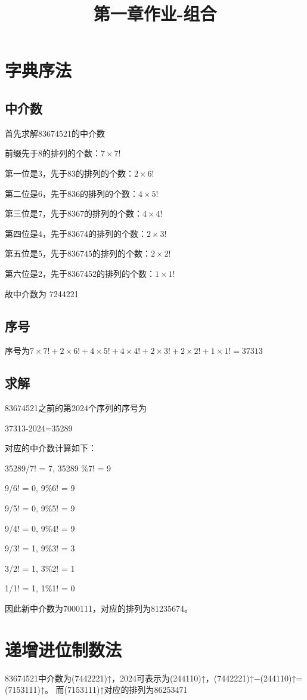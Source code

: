 \documentclass{article}
\title{第一章作业-组合}
\begin{document}
\begin{CJK}{UTF8}{gbsn}
\date{}


\maketitle

\section*{字典序法}
\subsection*{中介数} 
首先求解83674521的中介数

前缀先于8的排列的个数：$7×7!$

第一位是3，先于83的排列的个数：$2×6!$

第二位是6，先于836的排列的个数：$4×5!$

第三位是7，先于8367的排列的个数：$4×4!$

第四位是4，先于83674的排列的个数：$2×3!$

第五位是5，先于836745的排列的个数：$2×2!$

第六位是2，先于8367452的排列的个数：$1×1!$

故中介数为 7244221

\subsection*{序号} 
序号为$7×7!+2×6!+4×5!+4×4!+2×3!+2×2!+1×1!=37313$
\subsection*{求解} 
83674521之前的第2024个序列的序号为

37313-2024=35289

对应的中介数计算如下：

35289/7! = 7, 35289 \%7! = 9 
 
9/6! = 0, 9\%6! = 9

9/5! = 0, 9\%5! = 9

9/4! = 0, 9\%4! = 9

9/3! = 1, 9\%3! = 3

3/2! = 1, 3\%2! = 1

1/1! = 1, 1\%1! = 0

因此新中介数为7000111，对应的排列为81235674。



\section*{递增进位制数法}
83674521中介数为(7442221)↑，2024可表示为(244110)↑，(7442221)↑−(244110)↑= (7153111)↑。
而(7153111)↑对应的排列为86253471

\end{CJK}
\end{document}
